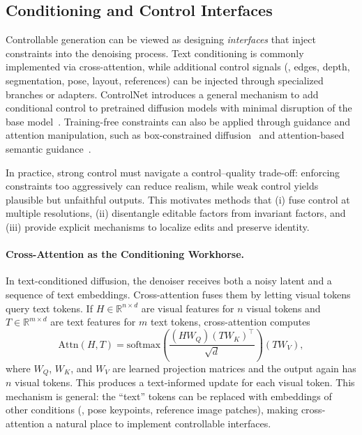 \subsection{Conditioning and Control Interfaces}
Controllable generation can be viewed as designing \emph{interfaces} that inject constraints into the denoising process. Text conditioning is commonly implemented via cross-attention, while additional control signals (\eg, edges, depth, segmentation, pose, layout, references) can be injected through specialized branches or adapters. ControlNet introduces a general mechanism to add conditional control to pretrained diffusion models with minimal disruption of the base model~\citep{zhang2023adding}. Training-free constraints can also be applied through guidance and attention manipulation, such as box-constrained diffusion~\citep{xie2023boxdiff} and attention-based semantic guidance~\citep{chefer2023attend, cao2023masactrl}.

In practice, strong control must navigate a control--quality trade-off: enforcing constraints too aggressively can reduce realism, while weak control yields plausible but unfaithful outputs. This motivates methods that (i) fuse control at multiple resolutions, (ii) disentangle editable factors from invariant factors, and (iii) provide explicit mechanisms to localize edits and preserve identity.

\paragraph{Cross-Attention as the Conditioning Workhorse.}
In text-conditioned diffusion, the denoiser receives both a noisy latent and a sequence of text embeddings. Cross-attention fuses them by letting visual tokens query text tokens. If $H\in\mathbb{R}^{n\times d}$ are visual features for $n$ visual tokens and $T\in\mathbb{R}^{m\times d}$ are text features for $m$ text tokens, cross-attention computes
\begin{equation}
\mathrm{Attn}(H,T)=\mathrm{softmax}\!\left(\frac{(HW_Q)(TW_K)^\top}{\sqrt{d}}\right)(TW_V),
\end{equation}
where $W_Q$, $W_K$, and $W_V$ are learned projection matrices and the output again has $n$ visual tokens. This produces a text-informed update for each visual token. This mechanism is general: the ``text'' tokens can be replaced with embeddings of other conditions (\eg, pose keypoints, reference image patches), making cross-attention a natural place to implement controllable interfaces.


